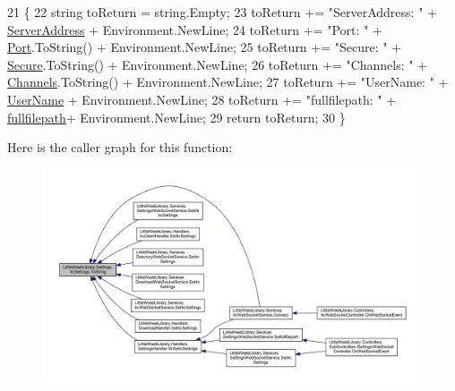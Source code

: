 \begin{DoxyCode}
21         \{
22             \textcolor{keywordtype}{string} toReturn = \textcolor{keywordtype}{string}.Empty;
23             toReturn += \textcolor{stringliteral}{"ServerAddress: "} + \mbox{\hyperlink{class_little_weeb_library_1_1_settings_1_1_irc_settings_a99953f00fc76a98af0bd06129876d5ef}{ServerAddress}} + Environment.NewLine;
24             toReturn += \textcolor{stringliteral}{"Port: "} + \mbox{\hyperlink{class_little_weeb_library_1_1_settings_1_1_irc_settings_a13491703ff0e9a96c87743e70002f6fe}{Port}}.ToString() + Environment.NewLine;
25             toReturn += \textcolor{stringliteral}{"Secure: "} + \mbox{\hyperlink{class_little_weeb_library_1_1_settings_1_1_irc_settings_aea7952c2d3db87eb5609feae15c5475c}{Secure}}.ToString() + Environment.NewLine;
26             toReturn += \textcolor{stringliteral}{"Channels: "} + \mbox{\hyperlink{class_little_weeb_library_1_1_settings_1_1_irc_settings_a395d5d33ff9f9699551a38b4ab6866e4}{Channels}}.ToString() + Environment.NewLine;
27             toReturn += \textcolor{stringliteral}{"UserName: "} + \mbox{\hyperlink{class_little_weeb_library_1_1_settings_1_1_irc_settings_a1a400295f11e155e37002041410e47f1}{UserName}} + Environment.NewLine;
28             toReturn += \textcolor{stringliteral}{"fullfilepath: "} + \mbox{\hyperlink{class_little_weeb_library_1_1_settings_1_1_irc_settings_ad1f67b09e16ba2b5fed2dcdefeac8e1a}{fullfilepath}}+ Environment.NewLine;
29             \textcolor{keywordflow}{return} toReturn;
30         \}
\end{DoxyCode}
Here is the caller graph for this function\+:\nopagebreak
\begin{figure}[H]
\begin{center}
\leavevmode
\includegraphics[width=350pt]{class_little_weeb_library_1_1_settings_1_1_irc_settings_a2e1d7f26d7d3083d19c3a9e6c6c2d0b2_icgraph}
\end{center}
\end{figure}


